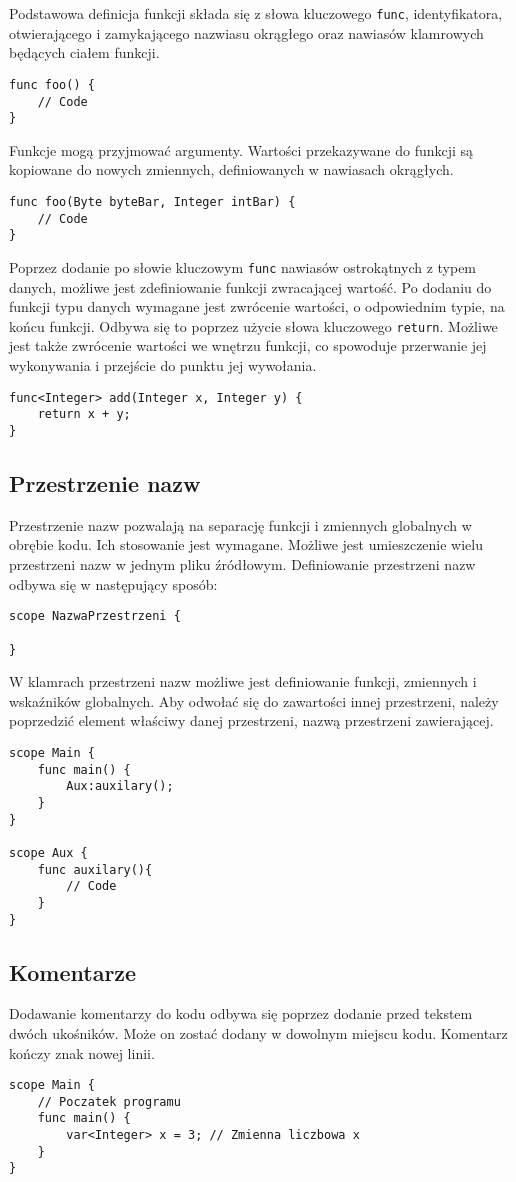 Podstawowa definicja funkcji składa się z słowa kluczowego \lstinline|func|, identyfikatora, otwierającego i zamykającego nazwiasu okrągłego oraz nawiasów klamrowych będących ciałem funkcji.
\begin{lstlisting}
func foo() {
	// Code
}
\end{lstlisting}

Funkcje mogą przyjmować argumenty. Wartości przekazywane do funkcji są kopiowane do nowych zmiennych, definiowanych w nawiasach okrągłych.
\begin{lstlisting}
func foo(Byte byteBar, Integer intBar) {
	// Code
}
\end{lstlisting}

Poprzez dodanie po słowie kluczowym \lstinline|func| nawiasów ostrokątnych z typem danych, możliwe jest zdefiniowanie funkcji zwracającej wartość. Po dodaniu do funkcji typu danych wymagane jest zwrócenie wartości, o odpowiednim typie, na końcu funkcji. Odbywa się to poprzez użycie słowa kluczowego \lstinline|return|. Możliwe jest także zwrócenie wartości we wnętrzu funkcji, co spowoduje przerwanie jej wykonywania i przejście do punktu jej wywołania.
\begin{lstlisting}
func<Integer> add(Integer x, Integer y) {
	return x + y;
}
\end{lstlisting}
\subsection{Przestrzenie nazw}
Przestrzenie nazw pozwalają na separację funkcji i zmiennych globalnych w obrębie kodu. Ich stosowanie jest wymagane. Możliwe jest umieszczenie wielu przestrzeni nazw w jednym pliku źródłowym. Definiowanie przestrzeni nazw odbywa się w następujący sposób:
\begin{lstlisting}
scope NazwaPrzestrzeni {

}
\end{lstlisting}
W klamrach przestrzeni nazw możliwe jest definiowanie funkcji, zmiennych i wskaźników globalnych. Aby odwołać się do zawartości innej przestrzeni, należy poprzedzić element właściwy danej przestrzeni, nazwą przestrzeni zawierającej.
\begin{lstlisting}
scope Main {
	func main() {
		Aux:auxilary();	
	}
}

scope Aux {
	func auxilary(){
		// Code
	}
}
\end{lstlisting}

\subsection{Komentarze}
Dodawanie komentarzy do kodu odbywa się poprzez dodanie przed tekstem dwóch ukośników. Może on zostać dodany w dowolnym miejscu kodu. Komentarz kończy znak nowej linii.
\begin{lstlisting}
scope Main {
	// Poczatek programu
	func main() {
		var<Integer> x = 3; // Zmienna liczbowa x
	}
}
\end{lstlisting}

